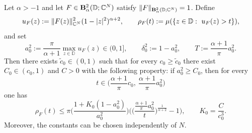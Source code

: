 \documentclass[a4paper,10pt]{amsart}
\newcommand{\D}{\mathbb{D}}
\begin{document}

\begin{numlemma}\label{lemma:BergmanSuperLevelSetsEstimateVector}
Let $\alpha>-1$ and let $F\in \mathbf B_\alpha^2(\D;\C^N)$ satisfy $\|F\|_{\mathbf B_\alpha^2(\D;\C^N)}=1$.
Define
\[
u_F(z):=\|F(z)\|_{\C^N}^2(1-|z|^2)^{\alpha+2},\qquad
\rho_F(t):=\mu(\{z\in\D:\ u_F(z)>t\}),
\]
and set
\[
a_0^2:=\frac{\pi}{\alpha+1}\max_{z\in\D}u_F(z)\in(0,1],\qquad \delta_0^2:=1-a_0^2,
\qquad T:=\frac{\alpha+1}{\pi}a_0^2.
\]
Then there exists $\widetilde c_0\in(0,1)$ such that for every $c_0\ge \widetilde c_0$
there exist $C_0\in(c_0,1)$ and $C>0$ with the following property:
if $a_0^2\ge C_0$, then for every
\[
t\in\Big(\frac{\alpha+1}{\pi}c_0,\ \frac{\alpha+1}{\pi}a_0^2\Big)
\]
one has
\begin{equation}\label{eqn:BergmanSuperLevelSetsEstimateVector}
\rho_F(t)\le \pi\Big(\frac{1+K_0(1-a_0^2)}{a_0^2}\Big)
\Big(\Big(\frac{\frac{\alpha+1}{\pi}a_0^2}{t}\Big)^{\frac1{\alpha+2}}-1\Big),
\qquad K_0=\frac{C}{c_0^3}.
\end{equation}
Moreover, the constants can be chosen independently of $N$.
\end{numlemma}
\end{document}
